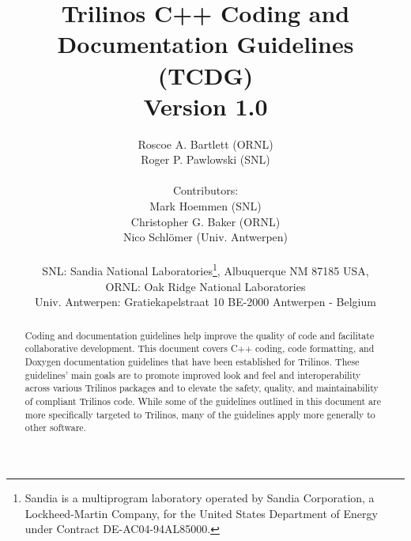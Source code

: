 \documentclass[pdf,11pt]{SANDreport}
\title{\center
Trilinos C++ Coding and \\ Documentation Guidelines \\[2ex] (TCDG)
\\[2ex] Version 1.0 }
\author{
%
Roscoe A. Bartlett (ORNL) \\
Roger P. Pawlowski (SNL) \\ \\
%
Contributors: \\
%
Mark Hoemmen (SNL) \\
Christopher G. Baker (ORNL) \\
Nico Schl\"{o}mer (Univ. Antwerpen) \\ \\
%
SNL: Sandia National Laboratories\footnote{Sandia is a multiprogram
laboratory operated by Sandia Corporation, a Lockheed-Martin Company,
for the United States Department of Energy under Contract
DE-AC04-94AL85000.}, Albuquerque NM 87185 USA, \\
%
ORNL: Oak Ridge National Laboratories \\
%
Univ. Antwerpen: Gratiekapelstraat 10 BE-2000 Antwerpen - Belgium }
\date{}
\begin{document}

\maketitle

%

%
\begin{abstract}
%
Coding and documentation guidelines help improve the quality of code
and facilitate collaborative development.  This document covers C++
coding, code formatting, and Doxygen documentation guidelines that
have been established for Trilinos.  These guidelines' main goals are
to promote improved look and feel and interoperability across various
Trilinos packages and to elevate the safety, quality, and
maintainability of compliant Trilinos code.  While some of the
guidelines outlined in this document are more specifically targeted to
Trilinos, many of the guidelines apply more generally to other
software.
%
\end{abstract}
%

%
%
%

%
\clearpage
\tableofcontents

\end{document}
